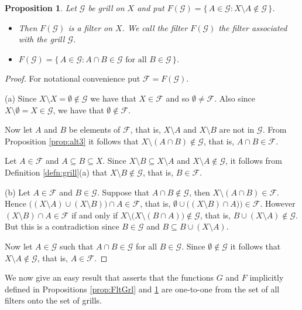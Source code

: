 \documentclass[12pt]{article}
\theoremstyle{plain}
\newtheorem{prop}[thm]{Proposition}
\theoremstyle{definition}
\newcommand{\calF}{\mathcal{F}}
\newcommand{\calG}{\mathcal{G}}
\begin{document}
\begin{prop}
  \label{prop:GrlFlt}
  Let $\calG$ be grill on $X$ and put $F(\calG) = \{\, A \in \calG : X \setminus A \not\in \calG \,\}$.
  \begin{itemize}
    \item[(a)] Then $F(\calG)$ is a filter on $X$.
      We call the filter $F(\calG)$ the \textsl{filter associated with the grill $\calG$}.
    \item[(b)] $F(\calG) = \{\, A \in \calG : \mbox{$A \cap B \in \calG$ for all $B \in \calG$} \,\}$.
  \end{itemize}
\end{prop}
\begin{proof}
  For notational convenience put $\calF = F(\calG)$.

  (a)
  Since $X \setminus X = \emptyset \not\in \calG$ we have that $X \in \calF$ and so $\emptyset \ne \calF$.
  Also since $X \setminus \emptyset = X \in \calG$, we have that $\emptyset \not\in \calF$.

  Now let $A$ and $B$ be elements of $\calF$, that is, $X \setminus A$ and $X \setminus B$ are not in $\calG$.
  From Proposition \ref{prop:alt3} it follows that $X \setminus (A \cap B) \not\in \calG$, that is, $A \cap B \in \calF$. 

  Let $A \in \calF$ and $A \subseteq B \subseteq X$.
  Since $X \setminus B \subseteq X \setminus A$ and $X \setminus A \not\in \calG$, it follows from Definition \ref{defn:grill}(a) that $X \setminus B \not\in \calG$, that is, $B \in \calF$.

  (b)
  Let $A \in \calF$ and $B \in \calG$.
  Suppose that $A \cap B \not\in \calG$, then $X \setminus (A \cap B) \in \calF$.
  Hence $\bigl( (X \setminus A) \cup (X \setminus B) \bigr) \cap A \in \calF$, that is, $\emptyset \cup \bigl( (X \setminus B) \cap A) \bigr) \in \calF$.
  However $(X \setminus B) \cap A \in \calF$ if and only if $X \setminus \bigl( X \setminus (B \cap A) \bigr) \not\in \calG$, that is, $B \cup (X \setminus A) \not\in \calG$.
  But this is a contradiction since $B \in \calG$ and $B \subseteq B \cup (X \setminus A)$.
  
  Now let $A \in \calG$ such that $A \cap B \in \calG$ for all $B \in \calG$.
  Since $\emptyset \not\in \calG$ it follows that $X \setminus A \not\in \calG$, that is, $A \in \calF$.
\end{proof}

We now give an easy result that asserts that the functions $G$ and $F$ implicitly defined in Propositions \ref{prop:FltGrl} and \ref{prop:GrlFlt} are one-to-one from the set of all filters onto the set of grills.
\end{document}
